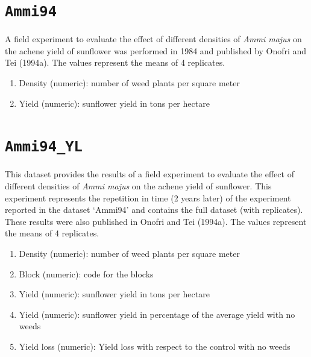 \documentclass[
  letterpaper,
  DIV=11,
  numbers=noendperiod]{scrreprt}
\providecommand{\tightlist}{%
  \setlength{\itemsep}{0pt}\setlength{\parskip}{0pt}}
\begin{document}
\section*{\texorpdfstring{\texttt{Ammi94}}{Ammi94}}\label{ammi94}


A field experiment to evaluate the effect of different densities of
\emph{Ammi majus} on the achene yield of sunflower was performed in 1984
and published by Onofri and Tei (1994a). The values represent the means
of 4 replicates.

\begin{enumerate}
\def\labelenumi{\arabic{enumi}.}
\tightlist
\item
  Density (numeric): number of weed plants per square meter
\item
  Yield (numeric): sunflower yield in tons per hectare
\end{enumerate}

\section*{\texorpdfstring{\texttt{Ammi94\_YL}}{Ammi94\_YL}}\label{ammi94_YL}


This dataset provides the results of a field experiment to evaluate the
effect of different densities of \emph{Ammi majus} on the achene yield
of sunflower. This experiment represents the repetition in time (2 years
later) of the experiment reported in the dataset `Ammi94' and contains
the full dataset (with replicates). These results were also published in
Onofri and Tei (1994a). The values represent the means of 4 replicates.

\begin{enumerate}
\def\labelenumi{\arabic{enumi}.}
\tightlist
\item
  Density (numeric): number of weed plants per square meter
\item
  Block (numeric): code for the blocks
\item
  Yield (numeric): sunflower yield in tons per hectare
\item
  Yield (numeric): sunflower yield in percentage of the average yield
  with no weeds
\item
  Yield loss (numeric): Yield loss with respect to the control with no
  weeds
\end{enumerate}
\end{document}
